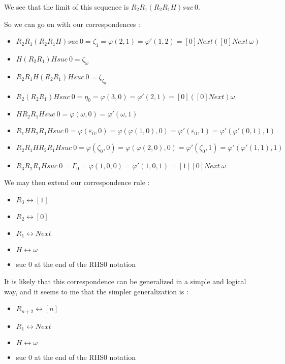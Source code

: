 \documentclass[10pt]{article}
\begin{document}
We see that the limit of this sequence is \( R_2 R_1 (R_2 R_1 H) suc\ 0 \).

\bigskip

So we can go on with our correspondences :

\begin{itemize}
     \setlength{\itemsep}{1pt}
     \setlength{\parskip}{0pt}
     \setlength{\parsep}{0pt}
\item \( R_2 R_1 (R_2 R_1 H) suc\ 0 = \zeta_1 = \varphi(2,1) = \varphi'(1,2) = [0] Next ([0] Next\ \omega) \)
\item \( H (R_2 R_1) H suc\ 0 = \zeta_\omega \)
\item \( R_2 R_1 H (R_2 R_1) H suc\ 0 = \zeta_{\zeta_0} \)
\item \( R_2 (R_2 R_1) H suc\ 0 = \eta_0 = \varphi(3,0) = \varphi'(2,1) = [0] ([0] Next) \omega \)
\item \( H R_2 R_1 H suc\ 0 = \varphi(\omega,0) = \varphi'(\omega,1) \)
\item \( R_1 H R_2 R_1 H suc\ 0 = \varphi(\varepsilon_0,0) = \varphi(\varphi(1,0),0) = \varphi'(\varepsilon_0,1) = \varphi'(\varphi'(0,1),1) \)
\item \( R_2 R_1 H R_2 R_1 H suc\ 0 = \varphi(\zeta_0,0) = \varphi(\varphi(2,0),0) = \varphi'(\zeta_0,1) = \varphi'(\varphi'(1,1),1) \)
\item \( R_3 R_2 R_1 H suc\ 0 = \Gamma_0 = \varphi(1,0,0) = \varphi'(1,0,1) = [1] [0] Next\ \omega \)
\end{itemize}

We may then extend our correspondence rule :

\begin{itemize}
     \setlength{\itemsep}{1pt}
     \setlength{\parskip}{0pt}
     \setlength{\parsep}{0pt}
\item \( R_3 \leftrightarrow [1] \)
\item \( R_2 \leftrightarrow [0] \)
\item \( R_1 \leftrightarrow Next \)
\item \( H \leftrightarrow \omega \)
\item suc 0 at the end of the RHS0 notation
\end{itemize}

It is likely that this correspondence can be generalized in a simple and logical way, and it seems to me that the simpler generalization is :

\begin{itemize}
     \setlength{\itemsep}{1pt}
     \setlength{\parskip}{0pt}
     \setlength{\parsep}{0pt}
\item \( R_{n+2} \leftrightarrow [n] \)
\item \( R_1 \leftrightarrow Next \)
\item \( H \leftrightarrow \omega \)
\item suc 0 at the end of the RHS0 notation
\end{itemize}
\end{document}
